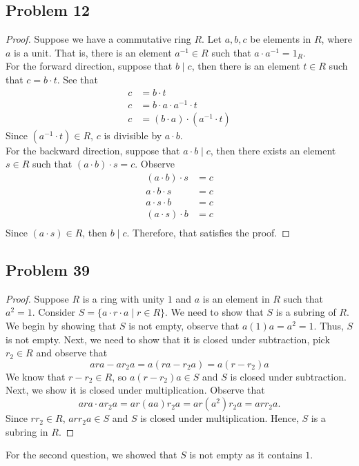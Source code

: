 \documentclass[a4paper,12pt]{article}
\begin{document}
\subsection*{Problem 12}
\begin{proof}
    Suppose we have a commutative ring $R$. Let $a,b,c$ be elements in $R$, where $a$ is a unit. That is, there is an element $a^{-1} \in R$ such that $a\cdot a^{-1}=1_R.$
   \\ For the forward direction, suppose that $b \mid c$, then there is an element $t \in R$ such that $c =b\cdot t.$ See that 
    \begin{align*}
        c&=b \cdot t\\
        c&=b \cdot a \cdot a^{-1} \cdot t\\
        c&=(b \cdot a) \cdot (a^{-1}\cdot t)
    \end{align*}
    Since $(a^{-1}\cdot t)\in R$, $c$ is divisible by $a\cdot b.$
    \\For the backward direction, suppose that $a\cdot b \mid c$, then there exists an element $s \in R$ such that $(a\cdot b) \cdot s=c.$ Observe
    \begin{align*}
        (a \cdot b)\cdot s&=c\\
        a \cdot b \cdot s&=c\\
        a \cdot s \cdot b&=c \\
        (a \cdot s) \cdot b&=c\\
    \end{align*}
    Since $(a \cdot s) \in R$, then $b \mid c.$ 
    Therefore, that satisfies the proof.
\end{proof}
\subsection*{Problem 39}
\begin{proof}
    Suppose $R$ is a ring with unity $1$ and $a$ is an element in $R$ such that
    $a^2=1.$ Consider $S=\{a\cdot r\cdot a \mid r \in R\}.$ We need to show that $S$ is a subring of $R.$
    We begin by showing that $S$ is not empty, observe that $a(1)a=a^2=1$. Thus, $S$ is not empty. Next, we need to show that it is closed under subtraction, pick $r_2 \in R$ and observe that
    \[
        ara-ar_2a = a(ra-r_2a)=a(r-r_2)a
    \]
    We know that $r-r_2 \in R$, so $a(r-r_2)a \in S$ and $S$ is closed under subtraction.
    Next, we show it is closed under multiplication. Observe that 
    \[ ara \cdot ar_2a = ar(aa)r_2a=ar(a^2)r_2a=arr_2a.\]
    Since $rr_2 \in R$, $arr_2a \in S$ and $S$ is closed under multiplication. Hence, $S$ is a subring in $R.$
\end{proof}
   For the second question, we showed that $S$ is not empty as it contains $1.$
\end{document}
